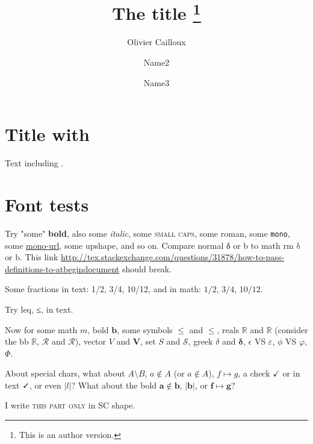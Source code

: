 \documentclass[version=last, pagesize, twoside=off, bibliography=totoc, DIV=calc, fontsize=14pt, a4paper, french, english]{scrartcl}
\begin{document}
\title{%
	\texorpdfstring{
		The title%
		\thanks{
			This is an author version.
		}
	}{%
		A formal framework for deliberated judgment
	}
}
\author{Olivier Cailloux}
\author{Name2}
\author{Name3}
\makeatletter
\makeatother
\maketitle

\section{Title with \electreTRI}
Text including \electreTRI.

\section{Font tests}
Try "some" \textbf{bold}, also some \textit{italic}, some \textsc{small caps}, some \textrm{roman}, some \texttt{mono}, some \url{mono-url}, some \textup{upshape}, and so on. Compare normal δ or b to math rm $\mathrm{\delta}$ or $\mathrm{b}$.
This link \url{http://tex.stackexchange.com/questions/31878/how-to-pass-definitions-to-atbegindocument} should break.

Some fractions in text: 1/2, 3/4, 10/12, and in math: $1/2$, $3/4$, $10/12$.

Try leq, ≤, in text.

Now for some math $m$, bold $\mathbf{b}$, some symbols $≤$ and $\mathbf{≤}$, reals $ℝ$ and $\mathbf{ℝ}$ (consider the bb $\mathbb{R}$, $\mathcal{R}$ and $\mathscr{R}$), vector $V$ and $\mathbf{V}$, set $S$ and $\mathcal{S}$, greek $\delta$ and $\mathbf{\delta}$, $\epsilon$ VS $\varepsilon$, $\phi$ VS $\varphi$, $\Phi$.

About special chars, what about $A \setminus B$, $a ∉ A$ (or $a \notin A$), $f \mapsto g$, a check $✓$ or in text ✓, or even $\lvert l\rvert$? What about the bold $\mathbf{a \notin b}$, $\mathbf{\lvert b\rvert}$, or $\mathbf{f \mapsto g}$?

I write \textsc{this part only} in SC shape.
\end{document}

